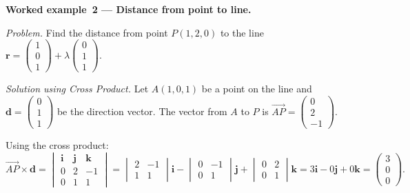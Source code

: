 \vspace{0.8em}
\noindent\textbf{Worked example~2 --- Distance from point to line.}

\noindent\textit{Problem.}
Find the distance from point $P(1, 2, 0)$ to the line
$\mathbf{r}
= \begin{pmatrix}1\\0\\1\end{pmatrix}
+ \lambda\begin{pmatrix}0\\1\\1\end{pmatrix}$.

\vspace{0.3em}
\noindent\textit{Solution using Cross Product.}
Let $A(1,0,1)$ be a point on the line and
$\mathbf{d} = \begin{pmatrix}0\\1\\1\end{pmatrix}$
be the direction vector.
The vector from $A$ to $P$ is
$\overrightarrow{AP} = \begin{pmatrix}0\\2\\-1\end{pmatrix}$.

Using the cross product:
\[
  \overrightarrow{AP} \times \mathbf{d}
  = \begin{vmatrix}
      \mathbf{i} & \mathbf{j} & \mathbf{k} \\
      0 & 2 & -1 \\
      0 & 1 & 1
    \end{vmatrix}
  = \begin{vmatrix} 2 & -1 \\ 1 & 1 \end{vmatrix}\mathbf{i}
  - \begin{vmatrix} 0 & -1 \\ 0 & 1 \end{vmatrix}\mathbf{j}
  + \begin{vmatrix} 0 & 2 \\ 0 & 1 \end{vmatrix}\mathbf{k}
  = 3\mathbf{i} - 0\mathbf{j} + 0\mathbf{k}
  = \begin{pmatrix}3\\0\\0\end{pmatrix}.
\]


